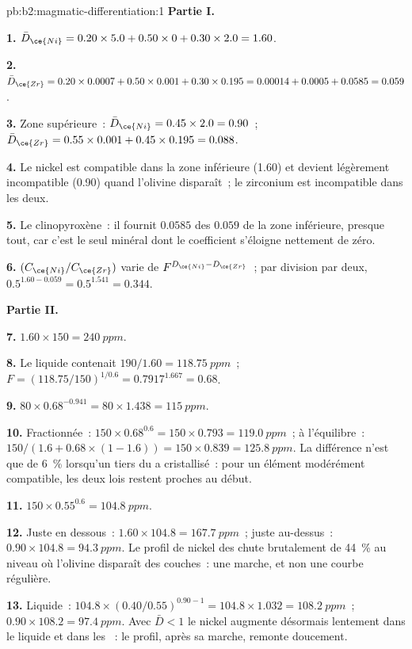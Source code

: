 \begin{solution}{pb:b2:magmatic-differentiation:1}
\noindent\textbf{Partie I.}

\textbf{1.} $\bar D_{\ce{Ni}} = 0.20\times5.0 + 0.50\times0 + 0.30\times2.0 = 1.60$.

\textbf{2.} $\bar D_{\ce{Zr}} = 0.20\times0.0007 + 0.50\times0.001 + 0.30\times0.195 =
0.00014 + 0.0005 + 0.0585 = 0.059$.

\textbf{3.} Zone supérieure~: $\bar D_{\ce{Ni}} = 0.45\times2.0 = 0.90$~; $\bar D_{\ce{Zr}} =
0.55\times0.001 + 0.45\times0.195 = 0.088$.

\textbf{4.} Le nickel est compatible dans la zone inférieure (1.60) et devient légèrement
incompatible (0.90) quand l'olivine disparaît~; le zirconium est incompatible dans les deux.

\textbf{5.} Le clinopyroxène~: il fournit $0.0585$ des $0.059$ de la zone inférieure, presque
tout, car c'est le seul minéral dont le coefficient s'éloigne nettement de zéro.

\textbf{6.} $(C_{\ce{Ni}}/C_{\ce{Zr}})$ varie de $F^{D_{\ce{Ni}} - D_{\ce{Zr}}}$~;
par division par deux, $0.5^{1.60 - 0.059} = 0.5^{1.541} = 0.344$.

\noindent\textbf{Partie II.}

\textbf{7.} $1.60\times150 = \qty{240}{ppm}$.

\textbf{8.} Le liquide contenait $190/1.60 = \qty{118.75}{ppm}$~; $F = (118.75/150)^{1/0.6} =
0.7917^{1.667} = 0.68$.

\textbf{9.} $80\times0.68^{-0.941} = 80\times1.438 = \qty{115}{ppm}$.

\textbf{10.} Fractionnée~: $150\times0.68^{0.6} = 150\times0.793 = \qty{119.0}{ppm}$~;
à l'équilibre~: $150/(1.6 + 0.68\times(1 - 1.6)) = 150\times0.839 = \qty{125.8}{ppm}$.
La différence n'est que de \qty{6}{\percent} lorsqu'un tiers du  a cristallisé~:
pour un élément modérément compatible, les deux lois restent proches au début.

\textbf{11.} $150\times0.55^{0.6} = \qty{104.8}{ppm}$.

\textbf{12.} Juste en dessous~: $1.60\times104.8 = \qty{167.7}{ppm}$~; juste au-dessus~:
$0.90\times104.8 = \qty{94.3}{ppm}$. Le profil de nickel des  chute
brutalement de \qty{44}{\percent} au niveau où l'olivine disparaît des
couches~: une marche, et non une courbe régulière.

\textbf{13.} Liquide~: $104.8\times(0.40/0.55)^{0.90 - 1} = 104.8\times1.032 =
\qty{108.2}{ppm}$~;  $0.90\times108.2 = \qty{97.4}{ppm}$. Avec $\bar D < 1$
le nickel augmente désormais lentement dans le liquide et dans les ~: le profil, après sa
marche, remonte doucement.


\end{solution}
